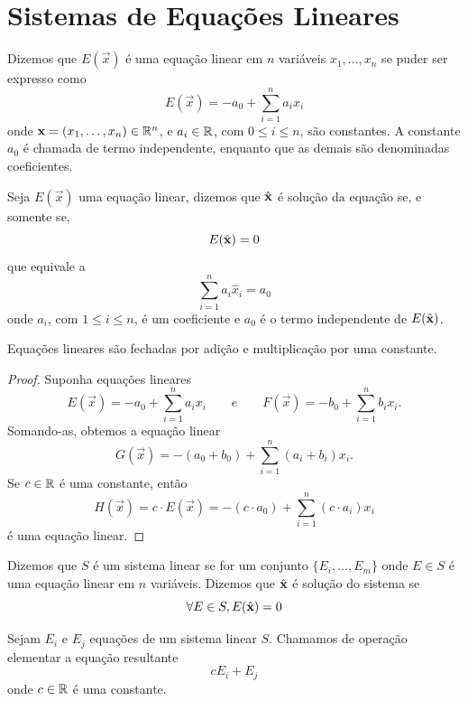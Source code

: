 \section{Sistemas de Equações Lineares}

\begin{def:equacao linear}
Dizemos que $E(\vec x)$ é uma equação linear em $n$ variáveis $x_1, \ldots, x_n$ se puder
ser expresso como
\[
	E(\vec x) = -a_0 + \sum_{i=1}^n a_i x_i
\]
onde $ \mathbf x = (x_1, \ldots, x_n) \in \mathbb{R}^n$, e $a_i \in \mathbb{R}$, com $0 \le i \le n$,
são constantes.
A constante $a_0$ é chamada de termo independente, enquanto que as demais são denominadas
coeficientes.
\end{def:equacao linear}

\begin{def:solucao}
Seja $E(\vec x)$ uma equação linear, dizemos que $\hat{\mathbf{x}}$ é solução da equação se, e somente
se,
\[
	E(\hat{\mathbf{x}}) = 0
\]
que equivale a
\[
	\sum_{i=1}^n a_i \hat x_i = a_0
\]
onde $a_i$, com $1 \le i \le n$, é um coeficiente e $a_0$ é o termo independente de $E(\hat{\mathbf{x}})$.
\end{def:solucao}

\begin{prop:operacoes equacoes}
Equações lineares são fechadas por adição e multiplicação por uma constante.
\end{prop:operacoes equacoes}
\begin{proof}
	Suponha equações lineares
	\[
		E(\vec x) = - a_0 + \sum_{i=1}^n a_i x_i \qquad e \qquad
		F(\vec x) = - b_0 + \sum_{i=1}^n b_i x_i.
	\]
	Somando-as, obtemos a equação linear
	\[
		G(\vec x) = -(a_0 + b_0) + \sum_{i=1}^n (a_i + b_i) x_i.
	\]
	Se $c \in \mathbb{R}$ é uma constante, então
	\[
		H(\vec x) = c \cdot E(\vec x) = -(c \cdot a_0) + \sum_{i=1}^n (c \cdot a_i) x_i
	\]
	é uma equação linear.
\end{proof}

\begin{def:sistema de equacoes}
Dizemos que $S$ é um sistema linear se for um conjunto $\{E_i, \ldots, E_m\}$ onde
$E \in S$ é uma equação linear em $n$ variáveis.
Dizemos que $\hat{\mathbf{x}}$ é solução do sistema se
\[
	\forall E \in S, E(\hat{\mathbf{x}}) = 0
\]
\end{def:sistema de equacoes}

\begin{def:operacao elementar}
Sejam $E_i$ e $E_j$ equações de um sistema linear $S$.
Chamamos de operação elementar a equação resultante
\[
	cE_i + E_j
\]
onde $c \in \mathbb{R}$ é uma constante.
\end{def:operacao elementar}

